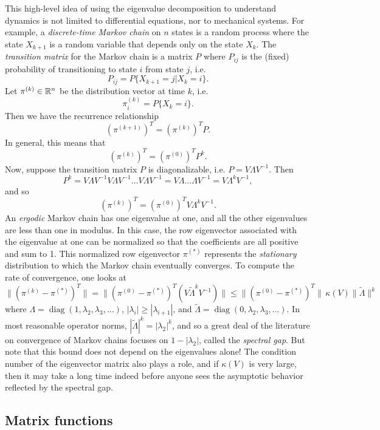 \documentclass[12pt, leqno]{article}
\begin{document}
This high-level idea of using the eigenvalue decomposition to
understand dynamics is not limited to differential equations, nor to
mechanical systems.  For example, a {\em discrete-time Markov chain}
on $n$ states is a random process where the state $X_{k+1}$ is a
random variable that depends only on the state $X_k$.  The {\em
  transition matrix} for the Markov chain is a matrix $P$ where
$P_{ij}$ is the (fixed) probability of transitioning to state $i$ from
state $j$, i.e.
\[
  P_{ij} = P\{X_{k+1} = j | X_{k} = i\}.
\]
Let $\pi^{(k)} \in \mathbb{R}^n$ be the distribution vector at time $k$,
i.e.
\[
  \pi^{(k)}_i = P\{X_k = i\}.
\]
Then we have the recurrence relationship
\[
  (\pi^{(k+1)})^T = (\pi^{(k)})^T P.
\]
In general, this means that
\[
  (\pi^{(k)})^T = (\pi^{(0)})^T P^k.
\]
Now, suppose the transition matrix $P$ is diagonalizable, i.e. $P = V
\Lambda V^{-1}$.  Then
\[
  P^k = V \Lambda V^{-1} V \Lambda V^{-1} \ldots V \Lambda V^{-1}
      = V \Lambda \ldots \Lambda V^{-1} = V \Lambda^k V^{-1},
\]
and so
\[
  (\pi^{(k)})^T = (\pi^{(0)})^T V \Lambda^k V^{-1}.
\]
An {\em ergodic} Markov chain has one eigenvalue at one, and all the
other eigenvalues are less than one in modulus.  In this case, the row
eigenvector associated with the eigenvalue at one can be normalized so
that the coefficients are all positive and sum to 1.  This normalized
row eigenvector $\pi^{(*)}$ represents the {\em stationary}
distribution to which the Markov chain eventually converges.  To
compute the rate of convergence, one looks at
\[
  \|(\pi^{(k)}-\pi^{(*)})^T\| =
  \|(\pi^{(0)}-\pi^{(*)})^T (V \tilde{\Lambda}^k V^{-1})\| \leq
  \|(\pi^{(0)}-\pi^{(*)})^T \| \, \kappa(V) \|\tilde{\Lambda}\|^k
\]
where $\Lambda = \operatorname{diag}(1, \lambda_2, \lambda_3,
\ldots)$, $|\lambda_i| \geq |\lambda_{i+1}|$, and $\tilde{\Lambda} =
\operatorname{diag}(0, \lambda_2, \lambda_3, \ldots)$.  In most
reasonable operator norms, $|\tilde{\Lambda}|^k = |\lambda_2|^k$,
and so a great deal of the literature on convergence of Markov chains
focuses on $1-|\lambda_2|$, called the {\em spectral gap}.
But note that this bound does not depend on the eigenvalues alone!
The condition number of the eigenvector matrix also plays a role, and
if $\kappa(V)$ is very large, then it may take a long time indeed
before anyone sees the asymptotic behavior reflected by the spectral gap.

\subsection{Matrix functions}
\end{document}
